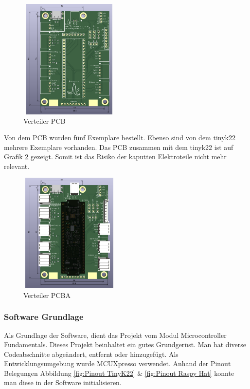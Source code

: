 \begin{figure}[H]
\centering
\includegraphics[width=5cm, height=6cm]{assets/ET/PCB/VerteilerPCB_unbestueckt.png}
\caption{Verteiler PCB}
\label{fig: Verteiler PCB}
\end{figure}

Von dem PCB wurden fünf Exemplare bestellt. Ebenso sind von dem \gls{tinyk22} mehrere Exemplare vorhanden. Das PCB zusammen mit dem \gls{tinyk22} ist auf Grafik \ref{fig: Verteiler PCBA} gezeigt. Somit ist das Risiko der kaputten Elektroteile nicht mehr relevant.

\begin{figure}[H]
\centering
\includegraphics[width=5cm, height=6cm]{assets/ET/PCB/VerteilerPCB_bestueckt.png}
\caption{Verteiler PCBA}
\label{fig: Verteiler PCBA}
\end{figure}


\subsubsection{Software Grundlage}

Als Grundlage der Software, dient das Projekt vom Modul Microcontroller Fundamentals. Dieses Projekt beinhaltet ein gutes Grundgerüst. Man hat diverse Codeabschnitte abgeändert, entfernt oder hinzugefügt. Als Entwicklungsumgebung wurde MCUXpresso verwendet. Anhand der Pinout Belegungen Abbildung \ref{fig:Pinout TinyK22} \& \ref{fig:Pinout Raspy Hat} konnte man diese in der Software initialisieren.



